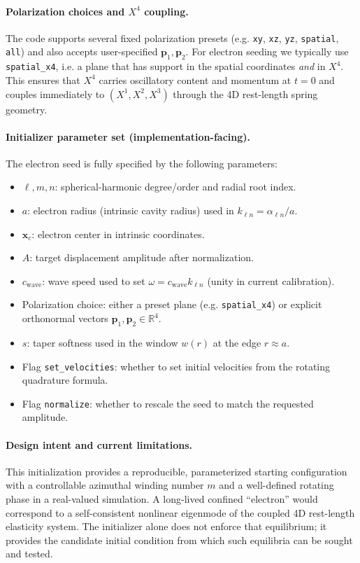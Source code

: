 \documentclass[11pt,a4paper]{article}
\newcommand{\R}{\mathbb{R}}
\newcommand{\x}{\mathbf{x}}                 %
\begin{document}
\paragraph{Polarization choices and \(X^4\) coupling.}
The code supports several fixed polarization presets (e.g. \texttt{xy}, \texttt{xz}, \texttt{yz},
\texttt{spatial}, \texttt{all}) and also accepts user-specified \(\mathbf{p}_1,\mathbf{p}_2\).
For electron seeding we typically use \texttt{spatial\_x4}, i.e. a plane that has support in the spatial
coordinates \emph{and} in \(X^4\). This ensures that \(X^4\) carries oscillatory content and momentum at
\(t=0\) and couples immediately to \((X^1,X^2,X^3)\) through the 4D rest-length spring geometry.

\paragraph{Initializer parameter set (implementation-facing).}
The electron seed is fully specified by the following parameters:
\begin{itemize}
  \item \(\ell,m,n\): spherical-harmonic degree/order and radial root index.
  \item \(a\): electron radius (intrinsic cavity radius) used in \(k_{\ell n}=\alpha_{\ell n}/a\).
  \item \(\x_c\): electron center in intrinsic coordinates.
  \item \(A\): target displacement amplitude after normalization.
  \item \(c_{\mathrm{wave}}\): wave speed used to set \(\omega=c_{\mathrm{wave}}k_{\ell n}\) (unity in current calibration).
  \item Polarization choice: either a preset plane (e.g. \texttt{spatial\_x4}) or explicit orthonormal vectors
        \(\mathbf{p}_1,\mathbf{p}_2\in\R^4\).
  \item \(s\): taper softness used in the window \(w(r)\) at the edge \(r\approx a\).
  \item Flag \texttt{set\_velocities}: whether to set initial velocities from the rotating quadrature formula.
  \item Flag \texttt{normalize}: whether to rescale the seed to match the requested amplitude.
\end{itemize}

\paragraph{Design intent and current limitations.}
This initialization provides a reproducible, parameterized starting configuration with a controllable
azimuthal winding number \(m\) and a well-defined rotating phase in a real-valued simulation.
A long-lived confined ``electron'' would correspond to a self-consistent nonlinear eigenmode of the
coupled 4D rest-length elasticity system. The initializer alone does not enforce that equilibrium; it
provides the candidate initial condition from which such equilibria can be sought and tested.
\end{document}
